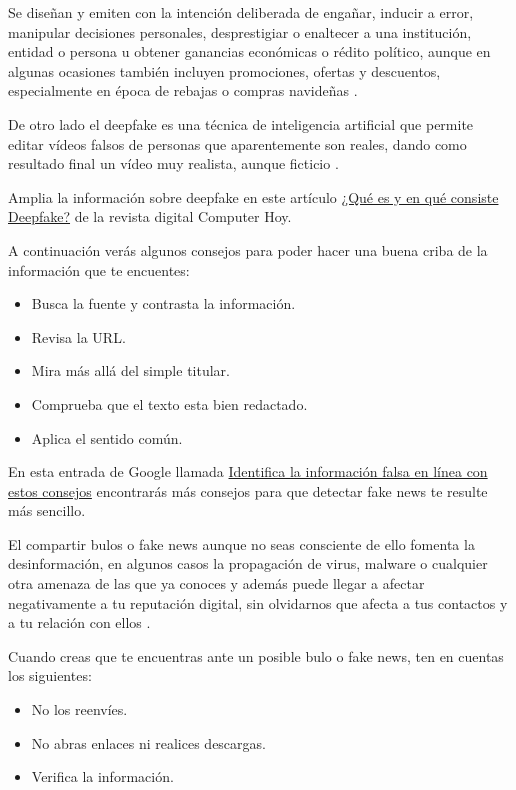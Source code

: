 \documentclass[
  spanish,
  a4paper,
  openany]{book}
\begin{document}
Se diseñan y emiten con la intención deliberada de engañar, inducir a error, manipular decisiones personales, desprestigiar o enaltecer a una institución, entidad o persona u obtener ganancias económicas o rédito político, aunque en algunas ocasiones también incluyen promociones, ofertas y descuentos, especialmente en época de rebajas o compras navideñas \citep{WIKI-fake-news}.

De otro lado el deepfake es una técnica de inteligencia artificial que permite editar vídeos falsos de personas que aparentemente son reales, dando como resultado final un vídeo muy realista, aunque ficticio \citep{WIKI-deepfake}.

Amplia la información sobre deepfake en este artículo \href{https://computerhoy.com/reportajes/tecnologia/consiste-deepfake-446355}{¿Qué es y en qué consiste Deepfake?} de la revista digital Computer Hoy.

A continuación verás algunos consejos para poder hacer una buena criba de la información que te encuentes:

\begin{itemize}
\item
  Busca la fuente y contrasta la información.
\item
  Revisa la URL.
\item
  Mira más allá del simple titular.
\item
  Comprueba que el texto esta bien redactado.
\item
  Aplica el sentido común.
\end{itemize}

En esta entrada de Google llamada \href{https://blog.google/products/news/consejos-verificacion-hechos/}{Identifica la información falsa en línea con estos consejos} encontrarás más consejos para que detectar fake news te resulte más sencillo.

El compartir bulos o fake news aunque no seas consciente de ello fomenta la desinformación, en algunos casos la propagación de virus, malware o cualquier otra amenaza de las que ya conoces y además puede llegar a afectar negativamente a tu reputación digital, sin olvidarnos que afecta a tus contactos y a tu relación con ellos \citep{OSI-frena-evita-bulos}.

Cuando creas que te encuentras ante un posible bulo o fake news, ten en cuentas los siguientes:

\begin{itemize}
\item
  No los reenvíes.
\item
  No abras enlaces ni realices descargas.
\item
  Verifica la información.
\end{itemize}
\end{document}
